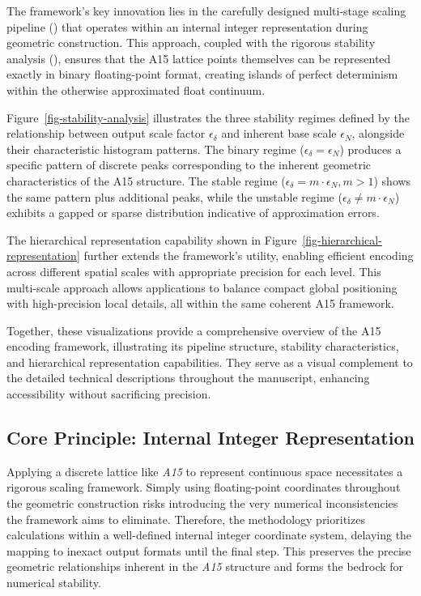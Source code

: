 \documentclass[10pt]{article}
\def\AAAB{\textit{A15}}
\begin{document}
The framework's key innovation lies in the carefully designed multi-stage scaling pipeline () that operates within an internal integer representation during geometric construction. This approach, coupled with the rigorous stability analysis (), ensures that the A15 lattice points themselves can be represented exactly in binary floating-point format, creating islands of perfect determinism within the otherwise approximated float continuum.

Figure~\ref{fig-stability-analysis} illustrates the three stability regimes defined by the relationship between output scale factor $\epsilon_\delta$ and inherent base scale $\epsilon_N$, alongside their characteristic histogram patterns. The binary regime ($\epsilon_\delta = \epsilon_N$) produces a specific pattern of discrete peaks corresponding to the inherent geometric characteristics of the A15 structure. The stable regime ($\epsilon_\delta = m \cdot \epsilon_N, m > 1$) shows the same pattern plus additional peaks, while the unstable regime ($\epsilon_\delta \neq m \cdot \epsilon_N$) exhibits a gapped or sparse distribution indicative of approximation errors.

The hierarchical representation capability shown in Figure~\ref{fig-hierarchical-representation} further extends the framework's utility, enabling efficient encoding across different spatial scales with appropriate precision for each level. This multi-scale approach allows applications to balance compact global positioning with high-precision local details, all within the same coherent A15 framework.

Together, these visualizations provide a comprehensive overview of the A15 encoding framework, illustrating its pipeline structure, stability characteristics, and hierarchical representation capabilities. They serve as a visual complement to the detailed technical descriptions throughout the manuscript, enhancing accessibility without sacrificing precision.

\subsection{Core Principle: Internal Integer Representation}\label{subsec-scaling-framework}

Applying a discrete lattice like \AAAB{} to represent continuous space necessitates a rigorous scaling framework. Simply using floating-point coordinates throughout the geometric construction risks introducing the very numerical inconsistencies the framework aims to eliminate. Therefore, the methodology prioritizes calculations within a well-defined internal integer coordinate system, delaying the mapping to inexact output formats until the final step. This preserves the precise geometric relationships inherent in the \AAAB{} structure and forms the bedrock for numerical stability.
\end{document}
